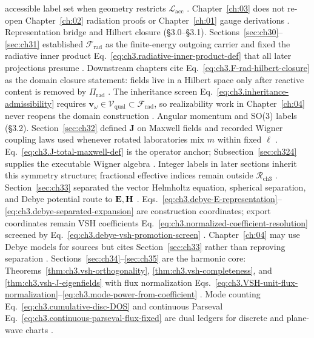 accessible label set when geometry restricts \(\mathcal{L}_{\mathrm{acc}}\) \cite{harrington2001}.
Chapter~\ref{ch:03} does not re-open Chapter~\ref{ch:02} radiation proofs or Chapter~\ref{ch:01} gauge derivations
\cite{belinfante1940}.
Representation bridge and Hilbert closure (§3.0--§3.1). Sections~\ref{sec:ch30}--\ref{sec:ch31} established \(\mathcal{F}_{\mathrm{rad}}\) as the finite-energy outgoing carrier and fixed the radiative
inner product Eq.~\eqref{eq:ch3.radiative-inner-product-def} that all later projections presume \cite{kato1995}.
Downstream chapters cite Eq.~\eqref{eq:ch3.F-rad-hilbert-closure} as the domain closure statement: fields live in a Hilbert space only after reactive
content is removed by \(\Pi_{\mathrm{rad}}\) \cite{harrington2001}. The inheritance screen Eq.~\eqref{eq:ch3.inheritance-admissibility}
requires \(\mathbf{v}_\omega\in\mathcal{V}_{\mathrm{qual}}\subset\mathcal{F}_{\mathrm{rad}}\), so realizability work in Chapter~\ref{ch:04} never
reopens the domain construction \cite{stratton1941}.
Angular momentum and SO(3) labels (§3.2). Section~\ref{sec:ch32} defined \(\mathbf{J}\) on Maxwell fields and recorded Wigner coupling laws used whenever rotated laboratories mix
\(m\) within fixed \(\ell\) \cite{jackson1999}. Eq.~\eqref{eq:ch3.J-total-maxwell-def} is the operator anchor;
Subsection~\ref{sec:ch324} supplies the executable Wigner algebra \cite{harrington2001}. Integer labels in later sections inherit
this symmetry structure; fractional effective indices remain outside \(\mathcal{R}_{\mathrm{ch3}}\) \cite{hansen1988}.
Section~\ref{sec:ch33} separated the vector Helmholtz equation, spherical separation, and Debye potential route to \(\mathbf{E},\mathbf{H}\)
\cite{stratton1941}. Eqs.~\eqref{eq:ch3.debye-E-representation}--\eqref{eq:ch3.debye-separated-expansion} are construction
coordinates; export coordinates remain VSH coefficients Eq.~\eqref{eq:ch3.normalized-coefficient-resolution} screened by
Eq.~\eqref{eq:ch3.debye-vsh-promotion-screen} \cite{belinfante1940}. Chapter~\ref{ch:04} may use Debye models for sources but cites
Section~\ref{sec:ch33} rather than reproving separation \cite{tai1994}.
Sections~\ref{sec:ch34}--\ref{sec:ch35} are the harmonic core: Theorems~\ref{thm:ch3.vsh-orthogonality}, \ref{thm:ch3.vsh-completeness}, and
\ref{thm:ch3.vsh-J-eigenfields} with flux normalization Eqs.~\eqref{eq:ch3.VSH-unit-flux-normalization}--\eqref{eq:ch3.mode-power-from-coefficient}
\cite{hansen1988}. Mode counting Eq.~\eqref{eq:ch3.cumulative-disc-DOS} and continuous Parseval
Eq.~\eqref{eq:ch3.continuous-parseval-flux-fixed} are dual ledgers for discrete and plane-wave charts \cite{jackson1999}.
